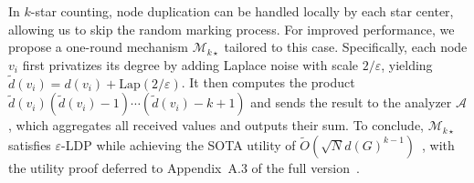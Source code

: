 In $k$-star counting, node duplication can be handled locally by each star center, allowing us to skip the random marking process. 
For improved performance, we propose a one-round mechanism $\mathcal{M}_{k\star}$ tailored to this case. 
Specifically, each node $v_i$ first privatizes its degree by adding Laplace noise with scale $2/\varepsilon$, yielding $\tilde{d}(v_i) = d(v_i) + \mathrm{Lap}(2/\varepsilon)$.  
It then computes the product $\tilde{d}(v_i)(\tilde{d}(v_i) - 1)\cdots(\tilde{d}(v_i) - k + 1)$ and sends the result to the analyzer $\mathcal{A}$,  
which aggregates all received values and outputs their sum.  
{To conclude, $\mathcal{M}_{k\star}$ satisfies $\varepsilon$-LDP while achieving the SOTA utility of $\tilde{O}(\sqrt{N}d(G)^{k-1})$~\cite{Imola2021}, with the utility proof deferred to Appendix~A.3 of the full version~\cite{full_version}.
}



